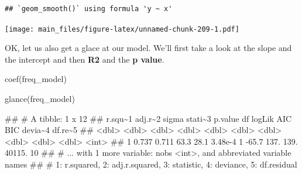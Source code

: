 \documentclass[
]{book}
\newenvironment{Shaded}{\begin{snugshade}}{\end{snugshade}}
\newcommand{\FunctionTok}[1]{\textcolor[rgb]{0.00,0.00,0.00}{#1}}
\newcommand{\NormalTok}[1]{#1}
\newcommand{\OtherTok}[1]{\textcolor[rgb]{0.56,0.35,0.01}{#1}}
\newcommand{\SpecialCharTok}[1]{\textcolor[rgb]{0.00,0.00,0.00}{#1}}
\begin{document}
\begin{verbatim}
## `geom_smooth()` using formula 'y ~ x'
\end{verbatim}

\texttt{[image: main\_files/figure-latex/unnamed-chunk-209-1.pdf]}

\begin{Shaded}
\end{Shaded}

OK, let us also get a glace at our model. We'll first take a look at the slope and the intercept and then \textbf{R2} and the \textbf{p value}.

\begin{Shaded}
\begin{Highlighting}[]
\FunctionTok{coef}\NormalTok{(freq\_model)}
\end{Highlighting}
\end{Shaded}

\begin{Shaded}
\end{Shaded}

\begin{Shaded}
\begin{Highlighting}[]
\FunctionTok{glance}\NormalTok{(freq\_model)}
\end{Highlighting}
\end{Shaded}

\begin{Shaded}
\begin{Highlighting}[]
\NormalTok{\#\# \# A tibble: 1 x 12}
\NormalTok{\#\#   r.squ\textasciitilde{}1 adj.r\textasciitilde{}2 sigma stati\textasciitilde{}3 p.value    df logLik   AIC   BIC devia\textasciitilde{}4 df.re\textasciitilde{}5}
\NormalTok{\#\#     \textless{}dbl\textgreater{}   \textless{}dbl\textgreater{} \textless{}dbl\textgreater{}   \textless{}dbl\textgreater{}   \textless{}dbl\textgreater{} \textless{}dbl\textgreater{}  \textless{}dbl\textgreater{} \textless{}dbl\textgreater{} \textless{}dbl\textgreater{}   \textless{}dbl\textgreater{}   \textless{}int\textgreater{}}
\NormalTok{\#\# 1   0.737   0.711  63.3    28.1 3.48e{-}4     1  {-}65.7  137.  139.  40115.      10}
\NormalTok{\#\# \# ... with 1 more variable: nobs \textless{}int\textgreater{}, and abbreviated variable names}
\NormalTok{\#\# \#   1: r.squared, 2: adj.r.squared, 3: statistic, 4: deviance, 5: df.residual}
\end{Highlighting}
\end{Shaded}
\end{document}

